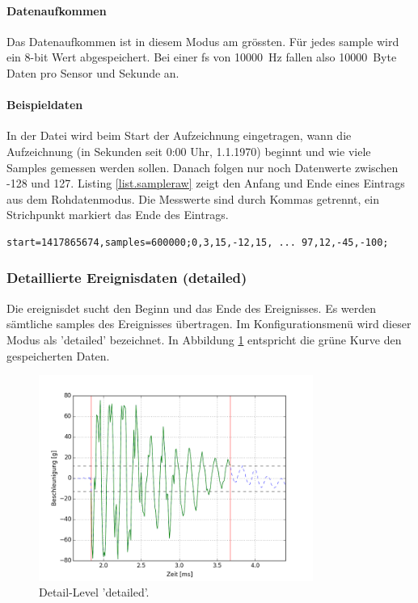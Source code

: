 \paragraph{Datenaufkommen} Das Datenaufkommen ist in diesem Modus am grössten. Für jedes \gls{sample} wird ein 8-bit Wert abgespeichert. Bei einer \gls{fs} von 10000~Hz fallen also 10000~Byte Daten pro Sensor und Sekunde an.

\paragraph{Beispieldaten} In der Datei wird beim Start der Aufzeichnung eingetragen, wann die Aufzeichnung (in Sekunden seit 0:00 Uhr, 1.1.1970) beginnt und wie viele Samples gemessen werden sollen. Danach folgen nur noch Datenwerte zwischen -128 und 127. Listing \ref{list.sampleraw} zeigt den Anfang und Ende eines Eintrags aus dem Rohdatenmodus. Die Messwerte sind durch Kommas getrennt, ein Strichpunkt markiert das Ende des Eintrags.

\begin{lstlisting}[caption=Beispieldaten auf Detail-Level 'raw', label=list.sampleraw]
start=1417865674,samples=600000;0,3,15,-12,15, ... 97,12,-45,-100;
\end{lstlisting}


\subsubsection{Detaillierte Ereignisdaten (detailed)}
Die \gls{ereignisdet} sucht den Beginn und das Ende des Ereignisses. Es werden sämtliche \glspl{sample} des Ereignisses übertragen. Im Konfigurationsmenü wird dieser Modus als 'detailed' bezeichnet. In Abbildung \ref{fig.detaildetailed} entspricht die grüne Kurve den gespeicherten Daten.

\begin{figure}
	\centering
		\includegraphics[width=0.8\textwidth]{images/detailed.png}
	\caption{Detail-Level 'detailed'.}
	\label{fig.detaildetailed}
\end{figure}

